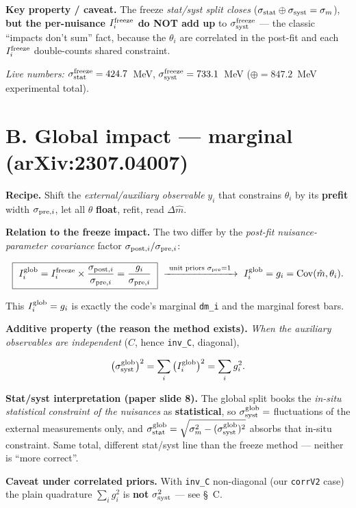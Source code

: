 \documentclass[11pt,a4paper]{article}
\newcommand{\code}[1]{\texttt{#1}}
\begin{document}
\textbf{Key property / caveat.} The freeze \emph{stat/syst split closes}
($\sigma_{\rm stat}\oplus\sigma_{\rm syst}=\sigma_m$), \textbf{but the
per-nuisance $I^{\rm freeze}_i$ do NOT add up} to $\sigma_{\rm syst}^{\rm freeze}$
--- the classic ``impacts don't sum'' fact, because the $\theta_i$ are correlated
in the post-fit and each $I^{\rm freeze}_i$ double-counts shared constraint.

\textit{Live numbers:} $\sigma_{\rm stat}^{\rm freeze}=424.7$~MeV,
$\sigma_{\rm syst}^{\rm freeze}=733.1$~MeV ($\oplus=847.2$~MeV experimental total).

\section*{B. Global impact --- marginal (arXiv:2307.04007)}

\textbf{Recipe.} Shift the \emph{external/auxiliary observable} $y_i$ that
constrains $\theta_i$ by its \textbf{prefit} width $\sigma_{{\rm pre},i}$, let all
$\theta$ \textbf{float}, refit, read $\Delta\hat m$.

\textbf{Relation to the freeze impact.} The two differ by the \emph{post-fit
nuisance-parameter covariance} factor $\sigma_{{\rm post},i}/\sigma_{{\rm pre},i}$:

\[
\boxed{\ I^{\rm glob}_i = I^{\rm freeze}_i\times\frac{\sigma_{{\rm post},i}}{\sigma_{{\rm pre},i}}
=\frac{g_i}{\sigma_{{\rm pre},i}}\ }\ \xrightarrow{\ \text{unit priors }\sigma_{\rm pre}=1\ }\
I^{\rm glob}_i = g_i = \mathrm{Cov}(\hat m,\theta_i).
\]

This $I^{\rm glob}_i=g_i$ is exactly the code's marginal \code{dm\_i} and the
marginal forest bars.

\textbf{Additive property (the reason the method exists).} \emph{When the
auxiliary observables are independent} ($C$, hence \code{inv\_C}, diagonal),

\[
\big(\sigma_{\rm syst}^{\rm glob}\big)^2=\sum_i \big(I^{\rm glob}_i\big)^2=\sum_i g_i^2 .
\]

\textbf{Stat/syst interpretation (paper slide 8).} The global split books the
\emph{in-situ statistical constraint of the nuisances} as \textbf{statistical}, so
$\sigma_{\rm syst}^{\rm glob}=$ fluctuations of the external measurements only,
and $\sigma_{\rm stat}^{\rm glob}=\sqrt{\sigma_m^2-(\sigma_{\rm syst}^{\rm glob})^2}$
absorbs that in-situ constraint. Same total, different stat/syst line than the
freeze method --- neither is ``more correct''.

\textbf{Caveat under correlated priors.} With \code{inv\_C} non-diagonal (our
\code{corrV2} case) the plain quadrature $\sum_i g_i^2$ is \textbf{not}
$\sigma_{\rm syst}^2$ --- see \S~C.
\end{document}
